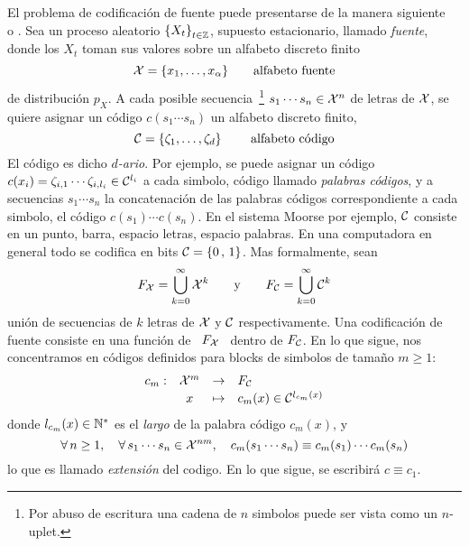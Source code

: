 El  problema  de  codificaci\'on  de  fuente  puede  presentarse  de  la  manera
siguiente~\cite[cap.~5]{CovTho06}   o  \cite[cap.~13]{Rio07}.  Sea   un  proceso
aleatorio $\left\{  X_t \right\}_{t \in \mathbb{Z}}$,  supuesto estacionario, llamado
{\it  fuente}, donde  los $X_t$  toman sus  valores sobre  un  alfabeto discreto
finito
%
\[
\mathcal{X} = \{ x_1 , \ldots , x_\alpha \} \qquad \mbox{alfabeto fuente}
\]
%
de  distribuci\'on  $p_X$.   A  cada posible  secuencia~\footnote{Por  abuso  de
  escritura una cadena  de $n$ simbolos puede ser vista  como un $n$-uplet.} $s_1
\cdots s_n  \in \mathcal{X}^n$ de  letras de $\mathcal{X}$,  se quiere asignar un  c\'odigo $c(s_1
\cdots s_n)$ un alfabeto discreto finito,
%
\[
\mathcal{C} = \{ \zeta_1 , \ldots , \zeta_d \} \qquad \mbox{ alfabeto c\'odigo}
\]
%
El c\'odigo es dicho {\it $d$-ario}.   Por ejemplo, se puede asignar un c\'odigo
$c(x_i)  =  \zeta_{i,1}  \cdots  \zeta_{i,l_i}  \in \mathcal{C}^{l_i}$  a  cada  simbolo,
c\'odigo llamado  {\it palabras c\'odigos}, y  a secuencias $s_1  \cdots s_n$ la
concatenaci\'on de las palabras c\'odigos correspondiente a cada simbolo, \ie el
c\'odigo $c(s_1) \cdots c(s_n)$. En el sistema Moorse por ejemplo, $\mathcal{C}$ consiste
en un  punto, barra,  espacio letras, espacio  palabras.  En una  computadora en
general todo se codifica en bits $\mathcal{C} = \{ 0 \, , \, 1\}$.  Mas formalmente, sean
%
\[
F_{\mathcal{X}}   =   \bigcup_{k=0}^{\infty}   \mathcal{X}^k   \qquad   \mbox{y}   \qquad   F_{\mathcal{C}}   =
\bigcup_{k=0}^{\infty} \mathcal{C}^k
\]
%
uni\'on  de  secuencias de  $k$  letras de  $\mathcal{X}$  y  $\mathcal{C}$ respectivamente.   Una
codificaci\'on  de fuente  consiste en  una funci\'on  de \  $F_{\mathcal{X}}$ \  dentro de
$F_{\mathcal{C}}$. En lo que sigue, nos  concentramos en c\'odigos definidos para blocks de
simbolos de tama\~no $m \ge 1$:
%
\[
\begin{array}{lccl}
c_m: & \X^m & \rightarrow & F_\C\\[.5mm]
%
& x & \mapsto & c_m(x) \in \C^{l_{c_m}(x)}
\end{array}
\]
%
donde $l_{c_m}(x) \in \mathbb{N}^*$ es el  {\it largo} de la palabra c\'odigo $c_m(x)$,
y
%
\[
\forall \, n \ge 1, \quad \forall  \, s_1 \cdots s_n \in \mathcal{X}^{n m}, \quad c_m(s_1
\cdots s_n) \equiv c_m(s_1) \cdots c_m(s_n)
\]
%
lo que es llamado {\it extensi\'on} del codigo.  En lo que sigue, se escribir\'a
$c \equiv c_1$.

